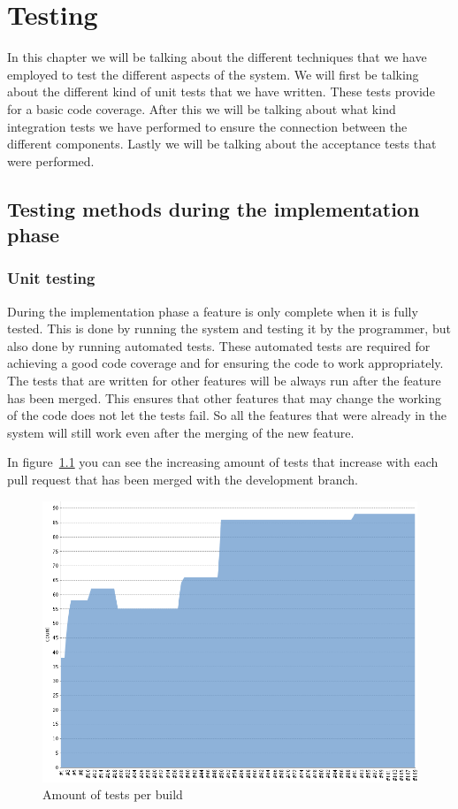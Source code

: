 \chapter{Testing}
In this chapter we will be talking about the different techniques that we have employed to test the different aspects of the system.
We will first be talking about the different kind of unit tests that we have written.
These tests provide for a basic code coverage.
After this we will be talking about what kind integration tests we have performed to ensure the connection between the different components.
Lastly we will be talking about the acceptance tests that were performed.

\section{Testing methods during the implementation phase}
\subsection{Unit testing}
During the implementation phase a feature is only complete when it is fully tested.
This is done by running the system and testing it by the programmer, but also done by running automated tests.
These automated tests are required for achieving a good code coverage and for ensuring the code to work appropriately.
The tests that are written for other features will be always run after the feature has been merged.
This ensures that other features that may change the working of the code does not let the tests fail.
So all the features that were already in the system will still work even after the merging of the new feature.

In figure~\ref{testresulttrenddev} you can see the increasing amount of tests that increase with each pull request that has been merged with the development branch.
\begin{figure}[h]
    \centering
    \includegraphics[width=\textwidth]{images/TestresultTrendDev2}
    \caption{Amount of tests per build}
    \label{testresulttrenddev}
\end{figure}

